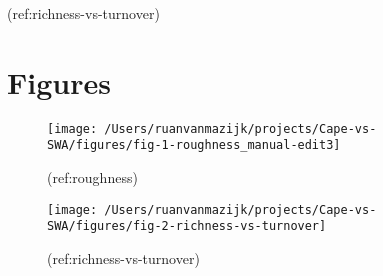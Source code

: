 (ref:richness-vs-turnover)

\hypertarget{figures}{%
\section*{Figures}\label{figures}}

\begin{figure}[H]
\texttt{[image: /Users/ruanvanmazijk/projects/Cape-vs-SWA/figures/fig-1-roughness\_manual-edit3]} \caption{(ref:roughness)}\label{fig:roughness}
\end{figure}

\begin{figure}[H]
\texttt{[image: /Users/ruanvanmazijk/projects/Cape-vs-SWA/figures/fig-2-richness-vs-turnover]} \caption{(ref:richness-vs-turnover)}\label{fig:richness-vs-turnover}
\end{figure}
